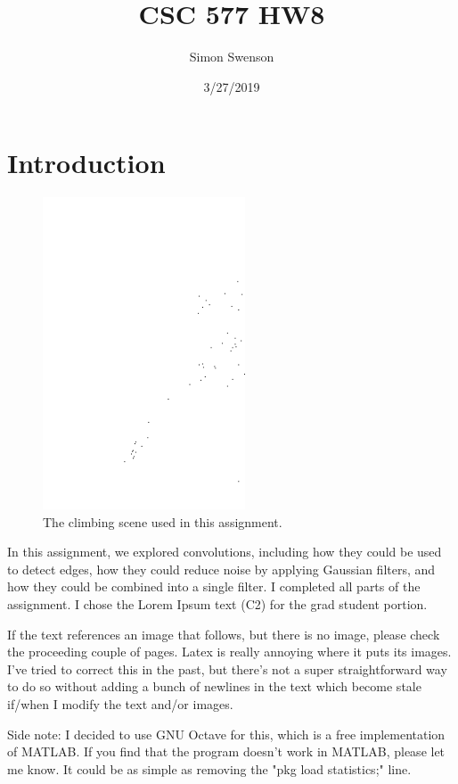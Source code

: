 \documentclass{article}
\title{CSC 577 HW8}
\date{3/27/2019}
\author{Simon Swenson}
\begin{document}
\maketitle
{}

\section{Introduction}

\begin{figure}[!ht]
	\centering
	\includegraphics[width=60mm]{figs/climber_im.png}
	\caption{The climbing scene used in this assignment.}
\end{figure}

In this assignment, we explored convolutions, including how they could be used to detect 
edges, how they could reduce noise by applying Gaussian filters, and how they could 
be combined into a single filter. I completed all parts of the assignment. I 
chose the Lorem Ipsum text (C2) for the grad student portion.

If the text references an image that follows, but there is no image, please 
check the proceeding couple of pages. Latex is really annoying where it puts its 
images. I've tried to correct this in the past, but there's not a super 
straightforward way to do so without adding a bunch of newlines in the text which 
become stale if/when I modify the text and/or images.

Side note: I decided to use GNU Octave for this, which is a free implementation 
of MATLAB. If you find that the program doesn't work in MATLAB, please let me 
know. It could be as simple as removing the "pkg load statistics;" line.
\end{document}
